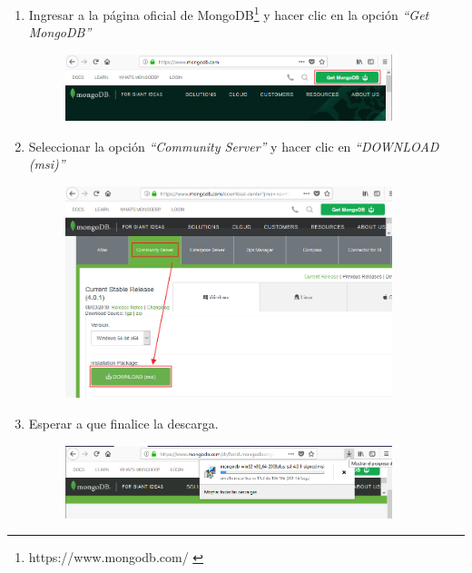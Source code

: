 \documentclass[a4paper,11pt]{paper}
\begin{document}
\begin{enumerate}
\def\labelenumi{\arabic{enumi}.}
\item
  Ingresar a la página oficial de {MongoDB}\footnote{https://www.mongodb.com/ \cite{mongo}} y hacer clic en la opción
  \emph{``Get MongoDB''}

  \begin{figure}[!h]
  \centering
  \includegraphics[width=0.9\textwidth]{imgs/instalacion/PaginaMongo.png}
  \end{figure}
\item
  Seleccionar la opción \emph{``Community Server''} y hacer clic en
  \emph{``DOWNLOAD (msi)''}

  \begin{figure}[!h]
  \centering
  \includegraphics[width=0.9\textwidth]{imgs/instalacion/DownloadServer.png}
  \end{figure}
\item
  Esperar a que finalice la descarga.

  \begin{figure}[!h]
  \centering
  \includegraphics[width=0.9\textwidth]{imgs/instalacion/ProcesoDescarga.png}
  \end{figure}


\end{enumerate}
\end{document}
